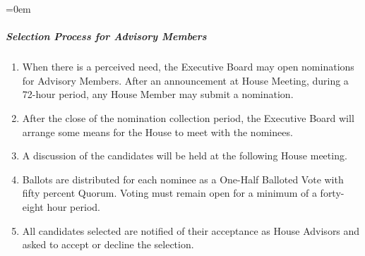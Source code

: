 \documentclass{article}
\newcommand{\asubsubsubsection}[1]{\parindent=0em\subparagraph{#1} \label{#1}}
\begin{document}
\asubsubsubsection{Selection Process for Advisory Members}
\begin{enumerate}
	\item When there is a perceived need, the Executive Board may open nominations for Advisory Members.
		After an announcement at House Meeting, during a 72-hour period, any House Member may submit a nomination.
	\item After the close of the nomination collection period, the Executive Board will arrange some means for the House to meet with the nominees.
	\item A discussion of the candidates will be held at the following House meeting.
	\item Ballots are distributed for each nominee as a One-Half Balloted Vote with fifty percent Quorum.
		Voting must remain open for a minimum of a forty-eight hour period.
	\item All candidates selected are notified of their acceptance as House Advisors and asked to accept or decline the selection.
\end{enumerate}
\end{document}
